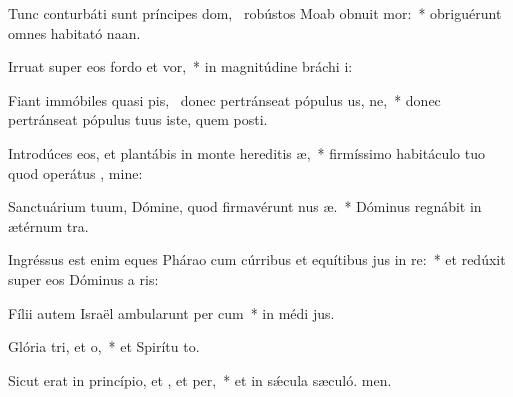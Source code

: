 \item Tunc conturbáti sunt príncipes dom,~\pscross{} robústos Moab obnuit mor:~* obriguérunt omnes habitató naan.
\item Irruat super eos fordo et vor,~* in magnitúdine bráchi i:
\item Fiant immóbiles quasi pis,~\pscross{} donec pertránseat pópulus us, ne,~* donec pertránseat pópulus tuus iste, quem posti.
\item Introdúces eos, et plantábis in monte hereditis æ,~* firmíssimo habitáculo tuo quod operátus , mine:
\item Sanctuárium tuum, Dómine, quod firmavérunt nus æ.~* Dóminus regnábit in ætérnum  tra.
\item Ingréssus est enim eques Phárao cum cúrribus et equítibus jus in re:~* et redúxit super eos Dóminus a ris:
\item Fílii autem Israël ambularunt per cum~* in médi jus.
\item Glória tri, et o,~* et Spirítu to.
\item Sicut erat in princípio, et , et per,~* et in sǽcula sæculó. men.
